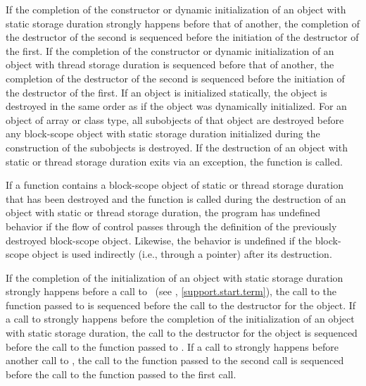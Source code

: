 \pnum
If the completion of the constructor or dynamic initialization of an object with static
storage duration strongly happens before that of another, the completion of the destructor
of the second is sequenced before the initiation of the destructor of the first.
If the completion of the constructor or dynamic initialization of an object with thread
storage duration is sequenced before that of another, the completion of the destructor
of the second is sequenced before the initiation of the destructor of the first.
If an object is
initialized statically, the object is destroyed in the same order as if
the object was dynamically initialized. For an object of array or class
type, all subobjects of that object are destroyed before any block-scope
object with static storage duration initialized during the construction
of the subobjects is destroyed.
If the destruction of an object with static or thread storage duration
exits via an exception,
the function  is called.

\pnum
If a function contains a block-scope object of static or thread storage duration that has been
destroyed and the function is called during the destruction of an object with static or
thread storage duration, the program has undefined behavior if the flow of control
passes through the definition of the previously destroyed block-scope object. Likewise, the
behavior is undefined if the block-scope object is used indirectly (i.e., through a
pointer) after its destruction.

\pnum
{}%
%
If the completion of the initialization of an object with static storage
duration strongly happens before a call to ~(see
, \ref{support.start.term}), the call to the function passed to
 is sequenced before the call to the destructor for the object. If a
call to  strongly happens before the completion of the initialization of
an object with static storage duration, the call to the destructor for the
object is sequenced before the call to the function passed to . If a
call to  strongly happens before another call to , the
call to the function passed to the second  call is sequenced before
the call to the function passed to the first  call.

